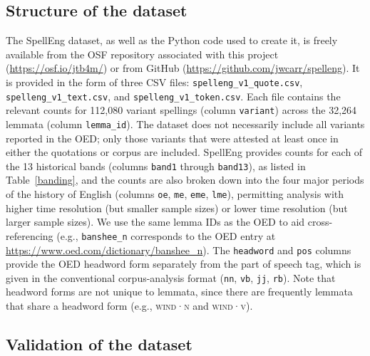 \documentclass[doc,biblatex]{apa7}
\newcommand\lemma[2]{\textsc{#1·#2}}
\begin{document}
\subsection{Structure of the dataset}

The SpellEng dataset, as well as the Python code used to create it, is freely available from the OSF repository associated with this project (\url{https://osf.io/jtb4m/}) or from GitHub (\url{https://github.com/jwcarr/spelleng}). It is provided in the form of three CSV files: \texttt{spelleng\_v1\_quote.csv}, \texttt{spelleng\_v1\_text.csv}, and \texttt{spelleng\_v1\_token.csv}. Each file contains the relevant counts for 112,080 variant spellings (column \texttt{variant}) across the 32,264 lemmata (column \texttt{lemma\_id}). The dataset does not necessarily include all variants reported in the OED; only those variants that were attested at least once in either the quotations or corpus are included. SpellEng provides counts for each of the 13 historical bands (columns \texttt{band1} through \texttt{band13}), as listed in Table~\ref{banding}, and the counts are also broken down into the four major periods of the history of English (columns \texttt{oe}, \texttt{me}, \texttt{eme}, \texttt{lme}), permitting analysis with higher time resolution (but smaller sample sizes) or lower time resolution (but larger sample sizes). We use the same lemma IDs as the OED to aid cross-referencing (e.g., \texttt{banshee\_n} corresponds to the OED entry at \url{https://www.oed.com/dictionary/banshee_n}). The \texttt{headword} and \texttt{pos} columns provide the OED headword form separately from the part of speech tag, which is given in the conventional corpus-analysis format (\texttt{nn}, \texttt{vb}, \texttt{jj}, \texttt{rb}). Note that headword forms are not unique to lemmata, since there are frequently lemmata that share a headword form (e.g., \lemma{wind}{n} and \lemma{wind}{v}).

\subsection{Validation of the dataset}
\end{document}
